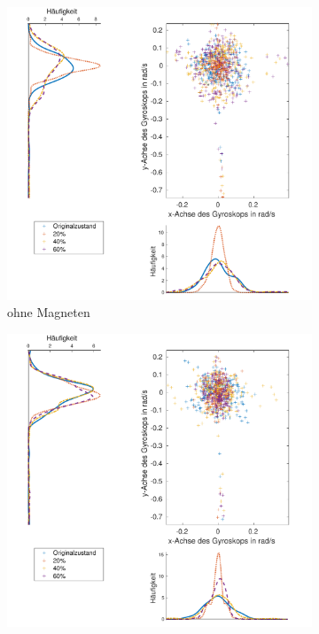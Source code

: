 \begin{landscape}
	\begin{figure}[htb]
		\centering
			\begin{subfigure}[c]{.45\linewidth}
				\centering
				\includegraphics[width=\linewidth]{Bilder/Gyr_Grund_20_40_60_ohneM.pdf}
				\caption{ohne Magneten} \label{Gyr_ohne}
			\end{subfigure}
			\hfill
			\begin{subfigure}[c]{.45\linewidth}
				\centering
				\includegraphics[width=\linewidth]{Bilder/Gyr_Grund_20_40_60_mitM.pdf}

\end{subfigure}
\end{figure}
\end{landscape}
